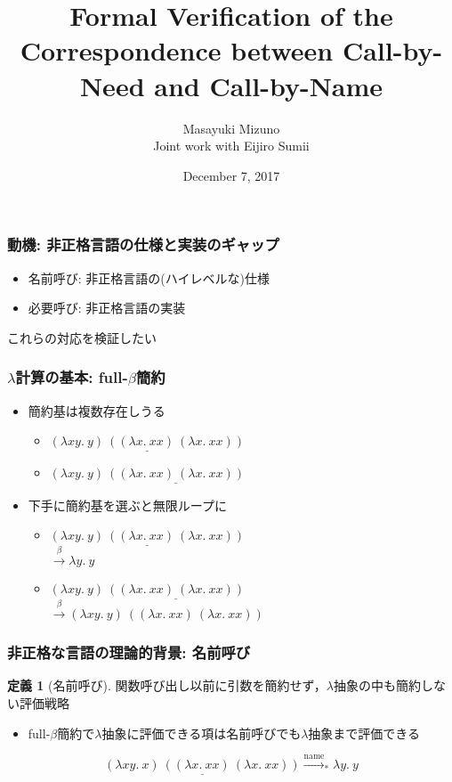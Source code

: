 \documentclass[dvipdfmx,cjk,xcolor=dvipsnames,envcountsect,notheorems,12pt]{beamer}
\title{Formal Verification of the Correspondence between Call-by-Need and Call-by-Name}
\author{Masayuki Mizuno\\Joint work with Eijiro Sumii}
\institute[東北大学 住井・松田研]{Tohoku University}%
\date{December 7, 2017}
\theoremstyle{definition}
\newtheorem{definition}{定義}
\newcommand{\FULLBETA}{\xrightarrow{\beta}}
\newcommand{\CALLBYNAME}{\xrightarrow{\mathrm{name}}}
\newcommand{\RTCLOS}[1]{#1_*}
\begin{document}
\frame[plain]{\titlepage}%

\begin{frame}
	\frametitle{動機: 非正格言語の仕様と実装のギャップ}
	\begin{itemize}
		\item 名前呼び: 非正格言語の(ハイレベルな)仕様
		\item 必要呼び: 非正格言語の実装
	\end{itemize}
	\vfill
	\begin{center}
		\Large
		これらの対応を検証したい
	\end{center}
\end{frame}

\begin{frame}
	\frametitle{$\lambda$計算の基本: full-$\beta$簡約}
	\begin{itemize}
		\item 簡約基は複数存在しうる
			\begin{itemize}
				\item $\underline{(\lambda xy.~y)~((\lambda x.~xx)~(\lambda x.~xx))}$
				\item $(\lambda xy.~y)~\underline{((\lambda x.~xx)~(\lambda x.~xx))}$
			\end{itemize}
		\item 下手に簡約基を選ぶと無限ループに
			\begin{itemize}
				\item 
					$\underline{(\lambda xy.~y)~((\lambda x.~xx)~(\lambda x.~xx))}$ \\
					$\FULLBETA \lambda y.~y$
				\item 
					$(\lambda xy.~y)~\underline{((\lambda x.~xx)~(\lambda x.~xx))}$ \\
					$\FULLBETA (\lambda xy.~y)~((\lambda x.~xx)~(\lambda x.~xx))$
			\end{itemize}
	\end{itemize}
\end{frame}

\begin{frame}
	\frametitle{非正格な言語の理論的背景: 名前呼び}
	\begin{definition}[名前呼び]
		\Large 関数呼び出し以前に引数を簡約せず，$\lambda$抽象の中も簡約しない評価戦略
	\end{definition}
	\begin{itemize}
		\item full-$\beta$簡約で$\lambda$抽象に評価できる項は名前呼びでも$\lambda$抽象まで評価できる\\
	\end{itemize}
	\large \[\underline{(\lambda xy.~x)~((\lambda x.~xx)~(\lambda x.~xx))} \RTCLOS{\CALLBYNAME} \lambda y.~y\]
\end{frame}
\end{document}
